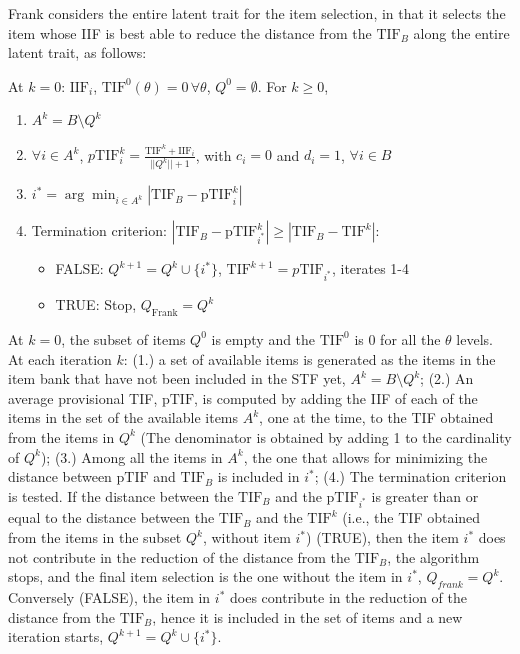 \documentclass{svproc}
\begin{document}
Frank considers the entire latent trait for the item selection, in that it selects the item whose IIF is best able to reduce the distance from the $\text{TIF}_B$ along the entire latent trait, as follows:


At $k = 0$: $\text{IIF}_i$, $\text{TIF}^0(\theta) = 0 \, \forall \theta$, $Q^0 = \emptyset$. For $k \geq 0$,

\begin{enumerate}
	\item  $A^k = B \setminus Q^k$ 
	\item $\forall i \in A^k$, $p\text{TIF}_{i}^k = \frac{\text{TIF}^k + \text{IIF}_{i}}{||Q^k||+1}$, with $c_i = 0$ and $d_i = 1$, $\forall i \in B$
	\item $i^* = \arg \min_{i \in A^k} |\text{TIF}_B - \text{pTIF}_i^k|$
	\item Termination criterion: $|\text{TIF}_B - \text{pTIF}_{i^*}^k| \geq |\text{TIF}_B - \text{TIF}^{k}|$: 
	\begin{itemize}
		\item FALSE:  $Q^{k+1} = Q^{k} \cup \{i^*\}$, $\text{TIF}^{k+1} = p\text{TIF}_{i^*}$, iterates 1-4 
		\item TRUE: Stop, %
		$Q_{\text{Frank}} = Q^k$
		
	\end{itemize}
\end{enumerate}
At $k = 0$, the subset of items $Q^0$ is empty and the $\text{TIF}^0$ is 0 for all the $\theta$ levels. 
At each iteration $k$: (1.) a set of available items is generated as the items in the item bank that have not been included in the STF yet, $A^k = B \setminus Q^k$; (2.)
An average provisional TIF, $\text{pTIF}$, is computed by adding the IIF of each of the items in the set of the available items $A^k$, one at the time, to the TIF obtained from the items in $Q^k$ (The denominator is obtained by adding 1 to the cardinality of $Q^k$); (3.) Among all the items in $A^k$, the one that allows for minimizing the distance between $\text{pTIF}$ and $\text{TIF}_B$ is included in $i^*$; (4.) 
The termination criterion is tested. 
If the distance between the $\text{TIF}_B$ and the $\text{pTIF}_{i^*}$ is greater than or equal to the distance between the $\text{TIF}_B$ and the $\text{TIF}^k$ (i.e., the TIF obtained from the items in the subset $Q^k$, without item $i^*$) (TRUE), then the item $i^*$ does not contribute in the reduction of the distance from the $\text{TIF}_B$, the algorithm stops, and the final item selection is the one without the item in $i^*$, $Q_{frank} = Q^k$. Conversely (FALSE), the item in $i^*$ does contribute in the reduction of the distance from the $\text{TIF}_B$, hence it is included in the set of items and a new iteration starts, $Q^{k+1} = Q^k \cup \{i^*\}$.
\end{document}
